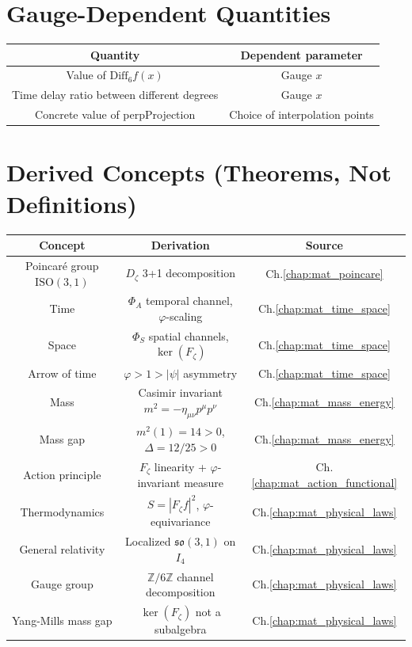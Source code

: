 \section{Gauge-Dependent Quantities}
\label{sec:mat_gauge_dependent}

\begin{center}
\begin{tabular}{|c|c|}
\hline
Quantity & Dependent parameter \\
\hline
Value of $\mathrm{Diff}_6 f(x)$ & Gauge $x$ \\
Time delay ratio between different degrees & Gauge $x$ \\
Concrete value of perpProjection & Choice of interpolation points \\
\hline
\end{tabular}
\end{center}

\section{Derived Concepts (Theorems, Not Definitions)}
\label{sec:mat_derived}

\begin{center}
\begin{tabular}{|c|c|c|}
\hline
Concept & Derivation & Source \\
\hline
Poincar\'{e} group $\mathrm{ISO}(3,1)$ & $D_\zeta$ 3+1 decomposition & Ch.\ref{chap:mat_poincare} \\
Time & $\Phi_A$ temporal channel, $\varphi$-scaling & Ch.\ref{chap:mat_time_space} \\
Space & $\Phi_S$ spatial channels, $\ker(F_\zeta)$ & Ch.\ref{chap:mat_time_space} \\
Arrow of time & $\varphi > 1 > |\psi|$ asymmetry & Ch.\ref{chap:mat_time_space} \\
Mass & Casimir invariant $m^2 = -\eta_{\mu\nu} p^\mu p^\nu$ & Ch.\ref{chap:mat_mass_energy} \\
Mass gap & $m^2(1) = 14 > 0$, $\Delta = 12/25 > 0$ & Ch.\ref{chap:mat_mass_energy} \\
Action principle & $F_\zeta$ linearity + $\varphi$-invariant measure & Ch.\ref{chap:mat_action_functional} \\
Thermodynamics & $S = |F_\zeta f|^2$, $\varphi$-equivariance & Ch.\ref{chap:mat_physical_laws} \\
General relativity & Localized $\mathfrak{so}(3,1)$ on $I_4$ & Ch.\ref{chap:mat_physical_laws} \\
Gauge group & $\mathbb{Z}/6\mathbb{Z}$ channel decomposition & Ch.\ref{chap:mat_physical_laws} \\
Yang-Mills mass gap & $\ker(F_\zeta)$ not a subalgebra & Ch.\ref{chap:mat_physical_laws} \\
\hline
\end{tabular}
\end{center}

